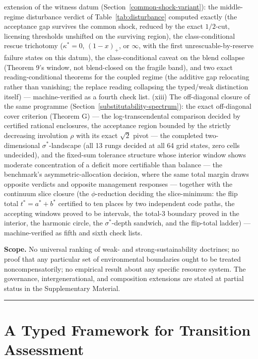 \documentclass[3p,11pt]{elsarticle}
\begin{document}
extension of the witness datum
(Section~\ref{common-shock-variant}): the middle-regime disturbance
verdict of Table~\ref{tab:disturbance} computed exactly (the
acceptance gap survives the common shock,
reduced by the exact \(1/2\)-cut, licensing thresholds unshifted
on the surviving region), the class-conditional rescue trichotomy
(\(\kappa^* = 0\),
\((1 - x)_+\), or \(\infty\), with the first
unrescuable-by-reserve failure states on this datum), the
class-conditional caveat on the blend collapse (Theorem 9's window,
not blend-closed on the fragile band), and two exact
reading-conditional theorems for the coupled regime (the additive
gap relocating rather than vanishing; the replace reading
collapsing the typed/weak distinction itself) --- machine-verified
as a fourth check list. (xiii) The off-diagonal closure of the same programme
(Section~\ref{substitutability-spectrum}): the exact
off-diagonal cover criterion (Theorem G) --- the log-transcendental
comparison decided by certified rational enclosures, the acceptance
region bounded by the strictly decreasing involution \(\rho\) with
its exact \(\sqrt{2}\) pivot --- the completed two-dimensional
\(\sigma^*\)-landscape (all 13 rungs decided at all 64 grid states,
zero cells undecided), and the fixed-sum tolerance structure whose
interior window shows moderate concentration of a deficit
more certifiable than balance --- the benchmark's
asymmetric-allocation decision, where the same total margin draws
opposite verdicts and opposite management responses --- together
with the continuum slice closure (the \(\phi\)-reduction deciding
the slice-minimum: the flip total \(t^{*} = a^{*} + b^{*}\)
certified to ten places by two independent code paths, the
accepting windows proved to be intervals, the total-\(3\) boundary
proved in the interior, the harmonic circle, the
\(\sigma^{*}\)-depth sandwich, and the flip-total ladder) ---
machine-verified as fifth and sixth check lists.

\textbf{Scope.} No universal ranking of weak- and strong-sustainability doctrines; no proof that any particular set of environmental boundaries ought to be treated noncompensatorily; no empirical result about any specific resource system. The governance, intergenerational, and composition extensions are stated at partial status in the Supplementary Material.

\begin{center}\rule{0.5\linewidth}{0.5pt}\end{center}

\section{A Typed Framework for Transition
Assessment}\label{a-typed-framework-for-transition-assessment}
\end{document}
